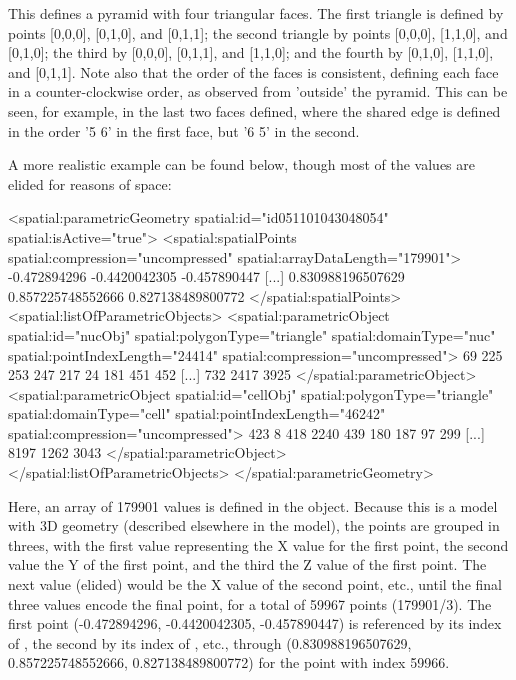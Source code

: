 This defines a pyramid with four triangular faces.  The first triangle is defined by points [0,0,0], [0,1,0], and [0,1,1]; the second triangle by points [0,0,0], [1,1,0], and [0,1,0]; the third by [0,0,0], [0,1,1], and [1,1,0]; and the fourth by [0,1,0], [1,1,0], and [0,1,1].  Note also that the order of the faces is consistent, defining each face in a counter-clockwise order, as observed from 'outside' the pyramid.  This can be seen, for example, in the last two faces defined, where the shared edge is defined in the order '5 6' in the first face, but '6 5' in the second.

A more realistic example can be found below, though most of the values are elided for reasons of space:

\begin{example}
  <spatial:parametricGeometry spatial:id="id051101043048054" spatial:isActive="true">
    <spatial:spatialPoints spatial:compression="uncompressed" spatial:arrayDataLength="179901">
          -0.472894296 -0.4420042305 -0.457890447 [...]
          0.830988196507629 0.857225748552666 0.827138489800772
    </spatial:spatialPoints>
    <spatial:listOfParametricObjects>
      <spatial:parametricObject spatial:id="nucObj" spatial:polygonType="triangle"
                                spatial:domainType="nuc" spatial:pointIndexLength="24414"
                                spatial:compression="uncompressed">
          69 225 253 247 217 24 181 451 452 [...] 732 2417 3925
      </spatial:parametricObject>
      <spatial:parametricObject spatial:id="cellObj" spatial:polygonType="triangle"
                                spatial:domainType="cell" spatial:pointIndexLength="46242"
                                spatial:compression="uncompressed">
          423 8 418 2240 439 180 187 97 299 [...] 8197 1262 3043
      </spatial:parametricObject>
    </spatial:listOfParametricObjects>
  </spatial:parametricGeometry>
\end{example}

Here, an array of 179901 values is defined in the \SpatialPoints object.  Because this is a model with 3D geometry (described elsewhere in the model), the points are grouped in threes, with the first value representing the X value for the first point, the second value the Y of the first point, and the third the Z value of the first point.  The next value (elided) would be the X value of the second point, etc., until the final three values encode the final point, for a total of 59967 points (179901/3).  The first point (-0.472894296, -0.4420042305, -0.457890447) is referenced by its index of , the second by its index of , etc., through (0.830988196507629, 0.857225748552666, 0.827138489800772) for the point with index 59966.

